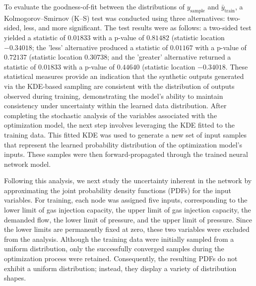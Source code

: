 To evaluate the goodness-of-fit between the distributions of \( y_{\text{sample}} \) and \( \bar{y}_{\text{train}} \), a Kolmogorov–Smirnov (K–S) test was conducted using three alternatives: two-sided, less, and more significant. The test results were as follows: a two-sided test yielded a statistic of \( 0.01833 \) with a p-value of \( 0.81482 \) (statistic location \(-0.34018\); the 'less' alternative produced a statistic of \( 0.01167 \) with a p-value of \( 0.72137 \) (statistic location \(0.30738\); and the 'greater' alternative returned a statistic of \( 0.01833 \) with a p-value of \( 0.44640 \) (statistic location \(-0.34018\). These statistical measures provide an indication that the synthetic outputs generated via the KDE-based sampling are consistent with the distribution of outputs observed during training, demonstrating the model's ability to maintain consistency under uncertainty within the learned data distribution. After completing the stochastic analysis of the variables associated with the optimization model, the next step involves leveraging the KDE fitted to the training data. This fitted KDE was used to generate a new set of input samples that represent the learned probability distribution of the optimization model's inputs. These samples were then forward-propagated through the trained neural network model. 

Following this analysis, we next study the uncertainty inherent in the network by approximating the joint probability density functions (PDFs) for the input variables. For training, each node was assigned five inputs, corresponding to the lower limit of gas injection capacity, the upper limit of gas injection capacity, the demanded flow, the lower limit of pressure, and the upper limit of pressure. Since the lower limits are permanently fixed at zero, these two variables were excluded from the analysis. Although the training data were initially sampled from a uniform distribution, only the successfully converged samples during the optimization process were retained. Consequently, the resulting PDFs do not exhibit a uniform distribution; instead, they display a variety of distribution shapes.


